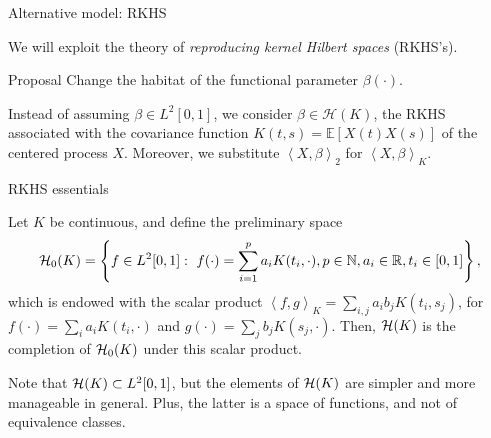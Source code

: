 \documentclass[10pt, english, professionalfonts]{beamer}
\newcommand\maroon[1]{\color{mLightBrown}#1\color{mDarkTeal}}
\newcommand{\N}{\mathbb{N}}
\newcommand{\R}{\mathbb{R}}
\newcommand{\Hcal}{\ensuremath\mathcal{H}}
\newcommand\dotprod[2]{\left\langle #1, #2 \right\rangle}
\begin{document}
\begin{frame}{Alternative model: RKHS}

We will exploit the theory of \textit{reproducing kernel Hilbert spaces} (RKHS's).

\vspace{1em}
\begin{alertblock}{Proposal}
  Change the habitat of the functional parameter \(\beta(\cdot)\).
\end{alertblock}

\vspace{1em}
  Instead of assuming \(\beta \in L^2[0, 1]\), we consider \maroon{\(\beta \in \mathcal H(K)\)}, the RKHS associated with the covariance function \(K(t, s)=\mathbb E[X(t)X(s)]\) of the centered process \(X\). Moreover, we substitute \(\dotprod{X}{\beta}_2\) for \maroon{\(\dotprod{X}{\beta}_K\)}.
\end{frame}


\begin{frame}{RKHS essentials}
  \begin{definition}
    Let \(K\) be continuous, and define the preliminary space
    \[
    \Hcal_0(K) = \left\{ f \in L^2[0,1]: \ f(\cdot) = \sum_{i=1}^p a_i K(t_i, \cdot),  p \in \N,  a_i \in \R,  t_i \in [0, 1] \right\},
    \]
    which is endowed with the scalar product \(\dotprod{f}{g}_K = \sum_{i, j} a_i b_j K(t_i, s_j)\), for \(f(\cdot)=\sum_i a_i K(t_i, \cdot) \) and \(g(\cdot)=\sum_j b_j K(s_j, \cdot)\). Then, \(\Hcal(K)\) is the completion of \(\Hcal_0(K)\) under this scalar product.
  \end{definition}

  \vspace{1em}

  Note that \(\Hcal(K)\subset L^2[0, 1]\), but the elements of \(\Hcal(K)\) are simpler and more manageable in general. Plus, the latter is a space of \maroon{functions}, and not of equivalence classes.
\end{frame}
\end{document}
